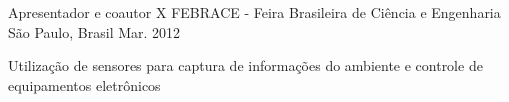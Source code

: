\begin{cventries}
  \cventry
    {Apresentador e coautor}
    {X FEBRACE - Feira Brasileira de Ciência e Engenharia}
    {São Paulo, Brasil}
    {Mar. 2012}
    {
      \begin{cvitems}
        \item {Utilização de sensores para captura de informações do ambiente e controle de equipamentos eletrônicos}
      \end{cvitems}
    }
\end{cventries}
